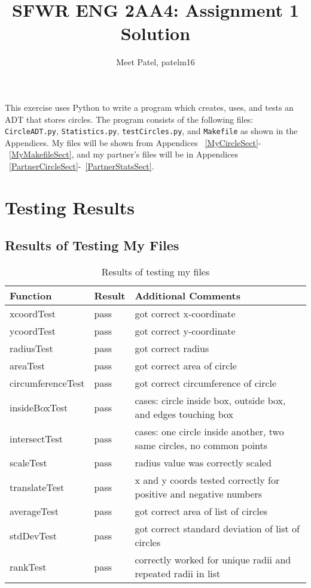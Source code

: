 \documentclass[12pt]{article}
\title{SFWR ENG 2AA4: Assignment 1 Solution}
\author{Meet Patel, patelm16}
\begin{document}
\maketitle

This exercise uses Python to write a program which creates, uses, and tests an ADT that stores circles. The program consists of the
following files: {\tt CircleADT.py}, {\tt Statistics.py}, {\tt testCircles.py}, and {\tt Makefile} as shown in the Appendices. My files will be shown from Appendices ~\ref{MyCircleSect}-~\ref{MyMakefileSect}, and my partner's files will be in Appendices ~\ref{PartnerCircleSect}-~\ref{PartnerStatsSect}.

\newpage
\tableofcontents
\newpage

\section{Testing Results}
\subsection{Results of Testing My Files}

\begin{table}[h]
	\centering
	\begin{tabularx}{\linewidth}{ l|l|X }
		\toprule
		Function & Result & Additional Comments\\
		\midrule
		xcoordTest & pass & got correct x-coordinate\\
		ycoordTest & pass & got correct y-coordinate\\
		radiusTest & pass & got correct radius\\
		areaTest & pass & got correct area of circle\\
		circumferenceTest & pass & got correct circumference of circle\\
		insideBoxTest & pass & cases: circle inside box, outside box, and edges touching box\\
		intersectTest & pass & cases: one circle inside another, two same circles, no common points\\
		scaleTest & pass & radius value was correctly scaled\\
		translateTest & pass &  x and y coords tested correctly for positive and negative numbers\\
		averageTest & pass & got correct area of list of circles\\
		stdDevTest & pass & got correct standard deviation of list of circles\\
		rankTest & pass & correctly worked for unique radii and repeated radii in list\\
		\bottomrule
	\end{tabularx}
	\caption{Results of testing my files}
	\label{Table : Results of testing my files}
\end{table}
\end{document}
